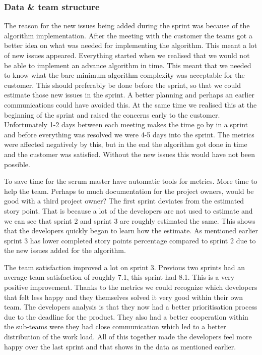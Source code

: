 \documentclass{article}
\begin{document}
\subsubsection{Data \& team structure}
The reason for the new issues being added during the sprint was because of the algorithm implementation. After the meeting with the customer the teams got a better idea on what was needed for implementing the algorithm. This meant a lot of new issues appeared. Everything started when we realised that we would not be able to implement an advance algorithm in time. This meant that we needed to know what the bare minimum algorithm complexity was acceptable for the customer. This should preferably be done before the sprint, so that we could estimate those new issues in the sprint. A better planning and perhaps an earlier communications could have avoided this. At the same time we realised this at the beginning of the sprint and raised the concerns early to the customer. Unfortunately 1-2 days between each meeting makes the time go by in a sprint and before everything was resolved we were 4-5 days into the sprint. The metrics were affected negatively by this, but in the end the algorithm got done in time and the customer was satisfied. Without the new issues this would have not been possible.

To save time for the scrum master have automatic tools for metrics. More time to help the team. Perhaps to much documentation for the project owners, would be good with a third project owner? 
The first sprint deviates from the  estimated story point. That is because a lot of the developers are not used to estimate and we can see that sprint 2 and sprint 3 are roughly estimated the same. This shows that the developers quickly began to learn how the estimate. As mentioned earlier sprint 3 has lower completed story points percentage compared to sprint 2 due to the new issues added for the algorithm.  

The team satisfaction improved a lot on sprint 3. Previous two sprints had an average team satisfaction of roughly 7.1, this sprint had 8.1. This is a very positive improvement. Thanks to the metrics we could recognize which developers that felt less happy and they themselves solved it very good within their own team. The developers analysis is that they now had a better prioritisation process due to the deadline for the product. They also had a better cooperation within the sub-teams were they had close communication which led to a better distribution of the work load. All of this together made the developers feel more happy over the last sprint and that shows in the data as mentioned earlier.
\end{document}
